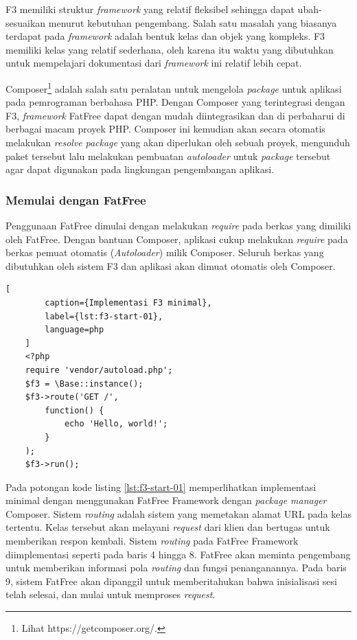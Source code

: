     
    F3 memiliki struktur \textit{framework} yang relatif fleksibel sehingga
    dapat ubah-sesuaikan menurut kebutuhan pengembang. Salah satu
    masalah yang biasanya terdapat pada \textit{framework} adalah bentuk kelas
    dan objek yang kompleks. F3 memiliki kelas yang relatif
    sederhana\cite{fatfree:docs-api}, oleh karena itu waktu yang dibutuhkan
    untuk mempelajari dokumentasi dari \textit{framework} ini relatif lebih
    cepat.
    
    Composer\footnote{Lihat https://getcomposer.org/.} adalah salah satu
    peralatan untuk mengelola \textit{package} untuk aplikasi pada pemrograman
    berbahasa PHP. Dengan Composer yang terintegrasi dengan F3, \textit{framework}
    FatFree dapat dengan mudah diintegrasikan dan di perbaharui di berbagai macam
    proyek PHP. Composer ini kemudian akan secara otomatis melakukan \textit{resolve}
    \textit{package} yang akan diperlukan oleh sebuah proyek, mengunduh paket
    tersebut lalu melakukan pembuatan \textit{autoloader} untuk \textit{package}
    tersebut agar dapat digunakan pada lingkungan pengembangan aplikasi.

    \subsubsection{Memulai dengan FatFree}
    Penggunaan FatFree dimulai dengan melakukan \textit{require} pada berkas yang
    dimiliki oleh FatFree. Dengan bantuan Composer, aplikasi cukup melakukan
    \textit{require} pada berkas pemuat otomatis (\textit{Autoloader}) milik Composer.
    Seluruh berkas yang dibutuhkan oleh sistem F3 dan aplikasi akan dimuat otomatis
    oleh Composer.
    
    \begin{lstlisting}[
        caption={Implementasi F3 minimal},
        label={lst:f3-start-01},
        language=php
    ]
    <?php
    require 'vendor/autoload.php';
    $f3 = \Base::instance();
    $f3->route('GET /',
        function() {
            echo 'Hello, world!';
        }
    );
    $f3->run();
    \end{lstlisting}
    
    Pada potongan kode listing \ref{lst:f3-start-01} memperlihatkan implementasi
    minimal dengan menggunakan FatFree Framework dengan \textit{package manager}
    Composer. Sistem \textit{routing} adalah sistem yang memetakan alamat URL pada
    kelas tertentu. Kelas tersebut akan melayani \textit{request} dari klien dan
    bertugas untuk memberikan respon kembali. Sistem \textit{routing} pada FatFree 
    Framework
    diimplementasi seperti pada baris 4 hingga 8. FatFree akan meminta
    pengembang untuk memberikan informasi pola \textit{routing} dan fungsi
    penanganannya. Pada baris 9, sistem FatFree akan dipanggil untuk
    memberitahukan bahwa inisialisasi sesi telah selesai, dan mulai untuk memproses
    \textit{request}.
    
